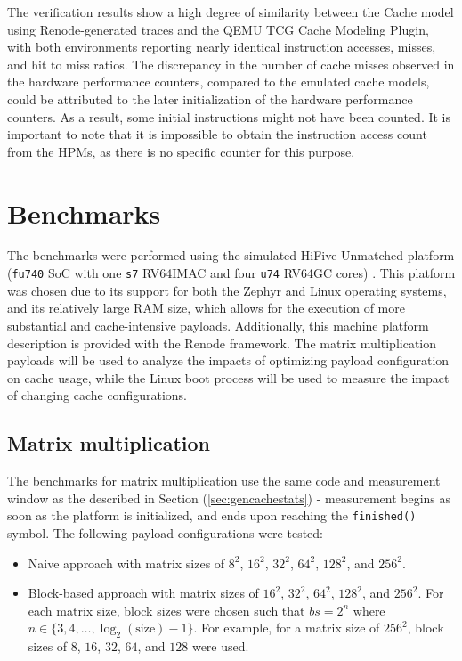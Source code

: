 \noindent The verification results show a high degree of similarity between the Cache model using Renode-generated traces and the QEMU TCG Cache Modeling Plugin, with both environments
reporting nearly identical instruction accesses, misses, and hit to miss ratios. The discrepancy in the number of cache misses observed in the hardware performance counters,
compared to the emulated cache models, could be attributed to the later initialization of the hardware performance counters. As a result, some initial instructions might not have
been counted. It is important to note that it is impossible to obtain the instruction access count from the HPMs, as there is no specific counter for this purpose.

\section{Benchmarks}

The benchmarks were performed using the simulated HiFive Unmatched platform (\texttt{fu740} SoC with one \texttt{s7} RV64IMAC and four \texttt{u74} RV64GC cores) \cite{fu740docs}.
This platform was chosen due to its support for both the Zephyr and Linux operating systems, and its relatively large RAM size, which allows for the execution of more substantial
and cache-intensive payloads. Additionally, this machine platform description is provided with the Renode framework.
The matrix multiplication payloads will be used to analyze the impacts of optimizing payload configuration on cache usage, while the Linux boot process will be used to measure the
impact of changing cache configurations.

\subsection{Matrix multiplication}

The benchmarks for matrix multiplication use the same code and measurement window as the described in Section (\ref{sec:gencachestats}) - measurement begins as soon
as the platform is initialized, and ends upon reaching the \texttt{finished()} symbol.
The following payload configurations were tested:
\begin{itemize}
	\item Naive approach with matrix sizes of $8^2$, $16^2$, $32^2$, $64^2$, $128^2$, and $256^2$.
	\item Block-based approach with matrix sizes of $16^2$, $32^2$, $64^2$, $128^2$, and $256^2$. For each matrix size, block sizes were chosen such that $bs = 2^n$ where
		$n \in \{3, 4, \ldots, \log_2(\text{size}) - 1\}$. For example, for a matrix size of $256^2$, block sizes of $8$, $16$, $32$, $64$, and $128$ were used.
\end{itemize}

